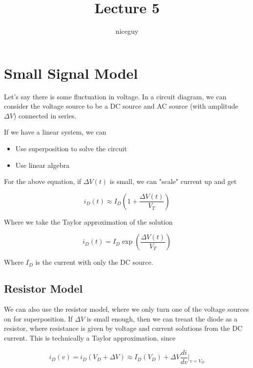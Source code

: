 \documentclass[12pt]{article}
\title{Lecture 5}
\author{niceguy}
\begin{document}
\maketitle

\section{Small Signal Model}

Let's say there is some fluctuation in voltage. In a circuit diagram, we can consider the voltage source to be a DC source and AC source (with amplitude $\Delta V$) connected in series.

If we have a linear system, we can

\begin{itemize}
    \item Use superposition to solve the circuit
    \item Use linear algebra
\end{itemize}

For the above equation, if $\Delta V(t)$ is small, we can "scale" current up and get

$$i_D(t) \approx I_D\left(1 + \frac{\Delta V(t)}{V_T}\right)$$

Where we take the Taylor approximation of the solution

$$i_D(t) = I_D\exp\left(\frac{\Delta V(t)}{V_T}\right)$$

Where $I_D$ is the current with only the DC source.

\subsection{Resistor Model}

We can also use the resistor model, where we only turn one of the voltage sources on for superposition. If $\Delta V$ is small enough, then we can treaat the diode as a resistor, where resistance is given by voltage and current solutions from the DC current. This is technically a Taylor approximation, since

$$i_D(v) = i_D(V_D + \Delta V) \approx I_D(V_D) + \Delta V \frac{di}{dv} \Big |_{v = V_D}$$
\end{document}
